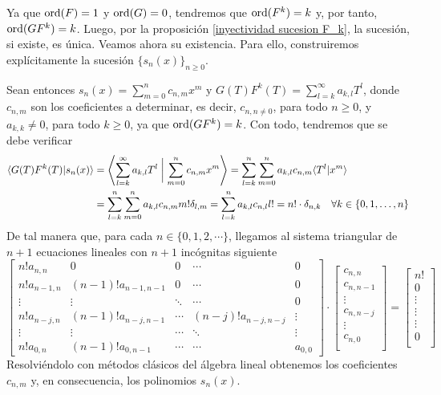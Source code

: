 \begin{demo}
    Ya que $\operatorname*{ord}(F) = 1$ y $\operatorname*{ord}(G) = 0$, tendremos que $\operatorname*{ord}(F^k) = k$ y, por tanto, $\operatorname*{ord}(G F^k) = k$. Luego, por la proposición \ref{inyectividad sucesion F_k}, la sucesión, si existe, es única. Veamos ahora su existencia. Para ello, construiremos explícitamente la sucesión $\{s_n(x)\}_{n \geq 0}$. 
    
    Sean entonces $s_n(x) = \sum_{m=0}^n c_{n,m}x^m \text{ y } G(T)F^k(T) = \sum_{l=k}^\infty a_{k,l}T^l$, donde $c_{n,m}$ son los coeficientes a determinar, es decir, $c_{n,n \neq 0}$, para todo $n \geq 0$, y $a_{k,k} \neq 0$, para todo $k \geq 0$, ya que $\operatorname*{ord}(GF^k) = k$. Con todo, tendremos que se debe verificar
    \begin{align*}
        \langle G(T)F^k(T)| s_n(x) \rangle & = \left\langle \sum_{l=k}^\infty a_{k,l}T^l \biggm| \sum_{m=0}^n c_{n,m}x^m \right\rangle = \sum_{l=k}^n \sum_{m=0}^n a_{k,l}c_{n,m} \langle T^l | x^m \rangle\\
        & = \sum_{l=k}^n \sum_{m=0}^n a_{k,l}c_{n,m} m! \delta_{l,m} = \sum_{l=k}^n a_{k,l}c_{n,l} l! = n! \cdot \delta_{n,k} \quad \forall k \in \{0,1, \ldots, n \}
    \end{align*}
    De tal manera que, para cada $n \in \{0, 1, 2, \cdots \}$, llegamos al sistema triangular de $n+1$ ecuaciones lineales con $n+1$ incógnitas siguiente
    \begin{equation*}
        \begin{bmatrix}
            n!a_{n,n} & 0 & 0 & \cdots & 0 \\
            n!a_{n-1,n} & (n-1)!a_{n-1,n-1} & 0 & \cdots & 0 \\
            \vdots & \vdots & \ddots & \cdots & 0 \\
            n!a_{n-j, n} & (n-1)!a_{n-j, n-1} & \cdots & (n-j)!a_{n-j, n-j} & \vdots \\
            \vdots & \vdots & \cdots & \ddots & \vdots \\
            n!a_{0,n} & (n-1)!a_{0, n-1} & \cdots & \cdots & a_{0,0}  
    \end{bmatrix}\cdot \begin{bmatrix}
        c_{n,n} \\
        c_{n,n-1} \\
        \vdots \\
        c_{n,n-j} \\
        \vdots \\
        c_{n,0} \\
    \end{bmatrix} = \begin{bmatrix}
        n! \\
        0 \\
        \vdots \\
        \vdots \\
        \vdots \\
        0 \\
    \end{bmatrix}
    \end{equation*}
    Resolviéndolo con métodos clásicos del álgebra lineal obtenemos los coeficientes $c_{n,m}$ y, en consecuencia, los polinomios $s_n(x)$. 
\end{demo}


